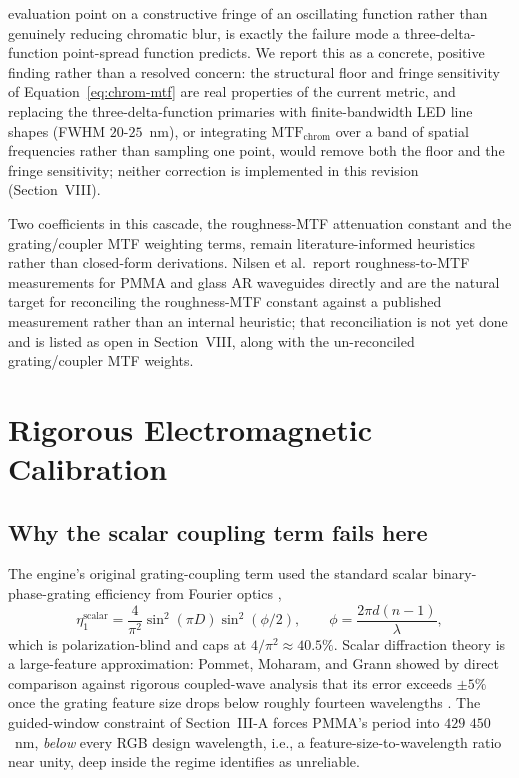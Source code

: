\documentclass[10pt,twocolumn]{article}
\begin{document}
evaluation point on a constructive fringe of an oscillating function
rather than genuinely reducing chromatic blur, is exactly the failure
mode a three-delta-function point-spread function predicts. We report
this as a concrete, positive finding rather than a resolved concern: the
structural floor and fringe sensitivity of Equation~\eqref{eq:chrom-mtf}
are real properties of the current metric, and replacing the
three-delta-function primaries with finite-bandwidth LED line shapes
(FWHM $20$-$25$~nm), or integrating $\mathrm{MTF}_{\mathrm{chrom}}$ over a
band of spatial frequencies rather than sampling one point, would remove
both the floor and the fringe sensitivity; neither correction is
implemented in this revision (Section~VIII).

Two coefficients in this cascade, the roughness-MTF
attenuation constant and the grating/coupler MTF weighting terms,
remain literature-informed heuristics rather than closed-form derivations.
Nilsen et al.\ report roughness-to-MTF measurements for PMMA and glass AR
waveguides directly \cite{nilsen2025} and are the natural target for
reconciling the roughness-MTF constant against a published measurement
rather than an internal heuristic; that reconciliation is not yet done and
is listed as open in Section~VIII, along with the un-reconciled
grating/coupler MTF weights.

\section{Rigorous Electromagnetic Calibration}

\subsection{Why the scalar coupling term fails here}
The engine's original grating-coupling term used the standard scalar
binary-phase-grating efficiency from Fourier optics \cite{goodman},
\begin{equation}
\eta_1^{\mathrm{scalar}} = \frac{4}{\pi^2}\sin^2(\pi D)\sin^2(\phi/2),
\qquad \phi = \frac{2\pi d(n-1)}{\lambda},
\label{eq:scalar-eta}
\end{equation}
which is polarization-blind and caps at $4/\pi^2\approx40.5\%$. Scalar
diffraction theory is a large-feature approximation: Pommet, Moharam, and
Grann showed by direct comparison against rigorous coupled-wave analysis
that its error exceeds $\pm5\%$ once the grating feature size drops below
roughly fourteen wavelengths \cite{pommet1994}. The guided-window
constraint of Section~III-A forces PMMA's period into $429$\textendash
$450$~nm, \emph{below} every RGB design wavelength, i.e., a
feature-size-to-wavelength ratio near unity, deep inside the regime
\cite{pommet1994} identifies as unreliable.
\end{document}
